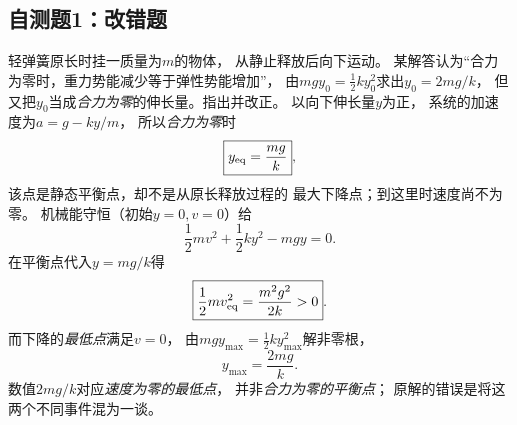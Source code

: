 \subsection{自测题1：改错题}

\problemtext 轻弹簧原长时挂一质量为$m$的物体，
从静止释放后向下运动。
某解答认为“合力为零时，重力势能减少等于弹性势能增加”，
由$mg y_0=\tfrac12ky_0^2$求出$y_0=2mg/k$，
但又把$y_0$当成\emph{合力为零}的伸长量。指出并改正。
\workings
以向下伸长量$y$为正，
系统的加速度为$a=g-ky/m$，
所以\emph{合力为零}时
\[
\boxed{y_{\rm eq}=\frac{mg}{k}},
\]
该点是静态平衡点，却不是从原长释放过程的
最大下降点；到这里时速度尚不为零。
机械能守恒（初始$y=0,v=0$）给
\[
\frac12mv^2+\frac12ky^2-mgy=0.
\]
在平衡点代入$y=mg/k$得
\[
\boxed{\frac12mv_{\rm eq}^2=\frac{m^2g^2}{2k}>0}.
\]
而下降的\emph{最低点}满足$v=0$，
由$mg y_{\max}=\frac12ky_{\max}^2$解非零根，
\[
\boxed{y_{\max}=\frac{2mg}{k}}.
\]
\crosscheck 数值$2mg/k$对应\emph{速度为零的最低点}，
并非\emph{合力为零的平衡点}；
原解的错误是将这两个不同事件混为一谈。

